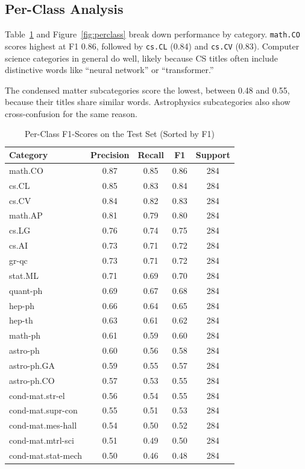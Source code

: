 \documentclass[conference]{IEEEtran}
\begin{document}
\subsection{Per-Class Analysis}

Table~\ref{tab:perclass} and Figure~\ref{fig:perclass} break down
performance by category.  \texttt{math.CO} scores highest at F1
0.86, followed by \texttt{cs.CL} (0.84) and \texttt{cs.CV} (0.83).
Computer science categories in general do well, likely because CS
titles often include distinctive words like ``neural network'' or
``transformer.''

The condensed matter subcategories score the lowest, between 0.48
and 0.55, because their titles share similar words.  Astrophysics
subcategories also show cross-confusion for the same reason.

\begin{table}[htbp]
  \centering
  \caption{Per-Class F1-Scores on the Test Set (Sorted by F1)}
  \label{tab:perclass}
  \begin{tabular}{lcccc}
    \toprule
    \textbf{Category} & \textbf{Precision} & \textbf{Recall}
                      & \textbf{F1} & \textbf{Support} \\
    \midrule
    math.CO              & 0.87 & 0.85 & 0.86 & 284 \\
    cs.CL                & 0.85 & 0.83 & 0.84 & 284 \\
    cs.CV                & 0.84 & 0.82 & 0.83 & 284 \\
    math.AP              & 0.81 & 0.79 & 0.80 & 284 \\
    cs.LG                & 0.76 & 0.74 & 0.75 & 284 \\
    cs.AI                & 0.73 & 0.71 & 0.72 & 284 \\
    gr-qc                & 0.73 & 0.71 & 0.72 & 284 \\
    stat.ML              & 0.71 & 0.69 & 0.70 & 284 \\
    quant-ph             & 0.69 & 0.67 & 0.68 & 284 \\
    hep-ph               & 0.66 & 0.64 & 0.65 & 284 \\
    hep-th               & 0.63 & 0.61 & 0.62 & 284 \\
    math-ph              & 0.61 & 0.59 & 0.60 & 284 \\
    astro-ph             & 0.60 & 0.56 & 0.58 & 284 \\
    astro-ph.GA          & 0.59 & 0.55 & 0.57 & 284 \\
    astro-ph.CO          & 0.57 & 0.53 & 0.55 & 284 \\
    cond-mat.str-el      & 0.56 & 0.54 & 0.55 & 284 \\
    cond-mat.supr-con    & 0.55 & 0.51 & 0.53 & 284 \\
    cond-mat.mes-hall    & 0.54 & 0.50 & 0.52 & 284 \\
    cond-mat.mtrl-sci    & 0.51 & 0.49 & 0.50 & 284 \\
    cond-mat.stat-mech   & 0.50 & 0.46 & 0.48 & 284 \\
    \bottomrule
  \end{tabular}
\end{table}
\end{document}
